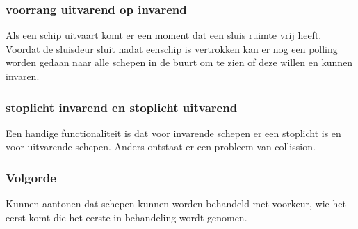 \subsubsection{voorrang uitvarend op invarend}
Als een schip uitvaart komt er een moment dat een sluis ruimte vrij heeft. Voordat de sluisdeur sluit nadat eenschip is vertrokken kan er nog een polling worden gedaan naar alle schepen in de buurt om te zien of deze willen en kunnen invaren.

\subsubsection{stoplicht invarend en stoplicht uitvarend}
Een handige functionaliteit is dat voor invarende schepen er een stoplicht is en voor uitvarende schepen. Anders ontstaat er een probleem van collission. 

\subsubsection{Volgorde}
Kunnen aantonen dat schepen kunnen worden behandeld met voorkeur, wie het eerst komt die het eerste in behandeling wordt genomen.